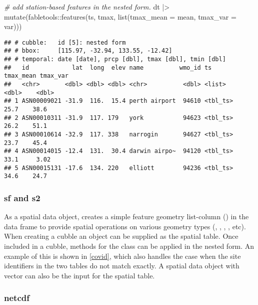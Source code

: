 \documentclass{article}
\newenvironment{Shaded}{\begin{snugshade}}{\end{snugshade}}
\newcommand{\AttributeTok}[1]{\textcolor[rgb]{0.77,0.63,0.00}{#1}}
\newcommand{\CommentTok}[1]{\textcolor[rgb]{0.56,0.35,0.01}{\textit{#1}}}
\newcommand{\FunctionTok}[1]{\textcolor[rgb]{0.00,0.00,0.00}{#1}}
\newcommand{\NormalTok}[1]{#1}
\newcommand{\SpecialCharTok}[1]{\textcolor[rgb]{0.00,0.00,0.00}{#1}}
\begin{document}
\begin{Shaded}
\begin{Highlighting}[]
\CommentTok{\# add station{-}based features in the nested form.}
\NormalTok{dt }\SpecialCharTok{|\textgreater{}} \FunctionTok{mutate}\NormalTok{(fabletools}\SpecialCharTok{::}\FunctionTok{features}\NormalTok{(ts, tmax, }\FunctionTok{list}\NormalTok{(}\AttributeTok{tmax\_mean =}\NormalTok{ mean, }\AttributeTok{tmax\_var =}\NormalTok{ var)))}
\end{Highlighting}
\end{Shaded}

\begin{verbatim}
## # cubble:   id [5]: nested form
## # bbox:     [115.97, -32.94, 133.55, -12.42]
## # temporal: date [date], prcp [dbl], tmax [dbl], tmin [dbl]
##   id            lat  long  elev name          wmo_id ts       tmax_mean tmax_var
##   <chr>       <dbl> <dbl> <dbl> <chr>          <dbl> <list>       <dbl>    <dbl>
## 1 ASN00009021 -31.9  116.  15.4 perth airport  94610 <tbl_ts>      25.7    38.6 
## 2 ASN00010311 -31.9  117. 179   york           94623 <tbl_ts>      26.2    51.1 
## 3 ASN00010614 -32.9  117. 338   narrogin       94627 <tbl_ts>      23.7    45.4 
## 4 ASN00014015 -12.4  131.  30.4 darwin airpo~  94120 <tbl_ts>      33.1     3.02
## 5 ASN00015131 -17.6  134. 220   elliott        94236 <tbl_ts>      34.6    24.7
\end{verbatim}

\hypertarget{sf-and-s2}{%
\subsubsection{sf and s2}\label{sf-and-s2}}

As a spatial data object,  creates a simple feature geometry list-column () in the data frame to provide spatial operations on various geometry types (, , , , etc). When creating a cubble an  object can be supplied as the spatial table. Once included in a cubble, methods for the  class can be applied in the nested form. An example of this is shown in \ref{covid}, which also handles the case when the site identifiers in the two tables do not match exactly. A spatial data object with  vector can also be the input for the spatial table.

\hypertarget{netcdf}{%
\subsubsection{netcdf}\label{netcdf}}
\end{document}
